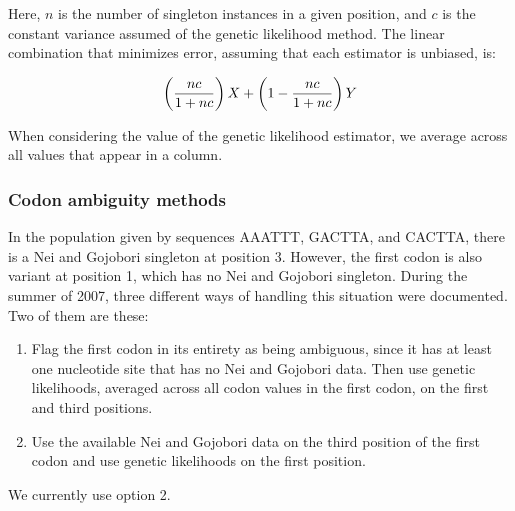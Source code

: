 \documentclass{article}
\begin{document}
	Here, $n$ is the number of singleton instances in a given position, and
	$c$ is the constant variance assumed of the genetic likelihood method.
	The linear combination that minimizes error, assuming that each
	estimator is unbiased, is:

	$$ \left( {nc \over 1 + nc} \right) X + \left (1 - {nc \over 1 +
	    nc}\right) Y $$

	When considering the value of the genetic likelihood estimator, we
	average across all values that appear in a column.

      \subsubsection{Codon ambiguity methods}
	\label{sec:codon-ambiguity}

	In the population given by sequences AAATTT, GACTTA, and CACTTA,
	there is a Nei and Gojobori singleton at position 3. However, the first codon
	is also variant at position 1, which has no Nei and Gojobori singleton.
	During the summer of 2007, three different ways of handling this situation were
	documented. Two of them are these:

	\begin{enumerate}
	  \item Flag the first codon in its entirety as being ambiguous, since
	  it has at least one nucleotide site that has no Nei and Gojobori data.
	  Then use genetic likelihoods, averaged across all codon values in the
	  first codon, on the first and third positions.

	  \item Use the available Nei and Gojobori data on the third position of
	  the first codon and use genetic likelihoods on the first position.
	\end{enumerate}

	We currently use option 2.
\end{document}
